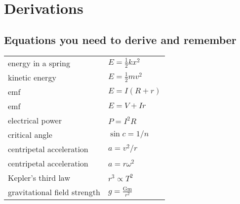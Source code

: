 \documentclass[a4paper,11pt,twoside]{memoir}
\begin{document}
\newpage
\section{Derivations}
\subsection{Equations you need to derive and remember}

\renewcommand*{\arraystretch}{2}
\begin{longtable}{ll}
energy in a spring & $E = \frac{1}{2}kx^2$ \\
kinetic energy & $E = \frac{1}{2}mv^{2}$\\
emf & $E = I(R+r)$\\
emf & $E = V + Ir$\\
electrical power & $P = I^{2}R$\\
critical angle & $\sin{c} = 1/n$\\
centripetal acceleration & $a = v^{2}/r$\\
centripetal acceleration & $a = r\omega^2$\\

Kepler's third law & $r^{3} \propto T^{2}$\\
gravitational field strength & \(g = \frac{\text{Gm}}{r^{2}}\)\\

\end{longtable}



\backmatter
\end{document}
